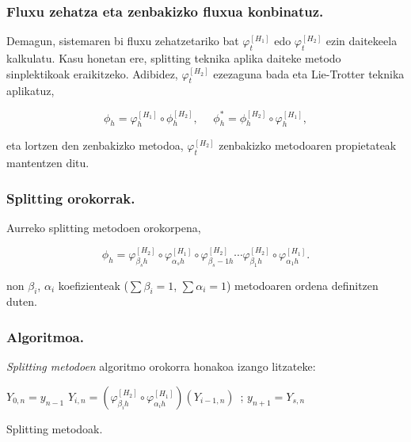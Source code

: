 \subsubsection*{Fluxu zehatza eta zenbakizko fluxua konbinatuz.}
Demagun, sistemaren bi fluxu zehatzetariko bat $\varphi_t^{[H_1]}$ edo $\varphi_t^{[H_2]}$ ezin daitekeela kalkulatu. Kasu honetan ere, splitting teknika aplika daiteke metodo sinplektikoak eraikitzeko. Adibidez, $\varphi_t^{[H_2]}$ ezezaguna bada eta Lie-Trotter teknika aplikatuz,

\begin{equation*}
\phi_h=\varphi_h^{[H_1]} \circ \phi_h^{[H_2]}, \ \ \ \ \ \  \phi_h^{*}=\phi_h^{[H_2]} \circ \varphi_h^{[H_1]},
\end{equation*}

eta lortzen den zenbakizko metodoa, $\varphi_t^{[H_2]}$ zenbakizko metodoaren propietateak mantentzen ditu. 

\subsubsection*{Splitting orokorrak.}

Aurreko splitting metodoen orokorpena,

\begin{equation}
\phi_h = \varphi_{\beta_s h}^{[H_2]} \circ \varphi_{\alpha_s h}^{[H_1]} \circ \varphi_{\beta_s-1 h}^{[H_2]} 
\cdots \varphi_{\beta_1 h}^{[H_2]} \circ \varphi_{\alpha_1 h}^{[H_1]} .
\end{equation}

non $\beta_i$, $\alpha_i$ koefizienteak ($\sum \beta_i=1$, $\sum \alpha_i=1$) metodoaren ordena definitzen duten.


\subsubsection*{Algoritmoa.}

\emph{Splitting metodoen} algoritmo orokorra honakoa izango litzateke:

\begin{algorithm}[H]
 \BlankLine
  {
   \BlankLine
    $Y_{0,n}=y_{n-1} $\;
    \BlankLine
   {
    \BlankLine 
    $Y_{i,n}=(\varphi^{[H_2]}_{\beta_i h} \circ \varphi^{[H_1]}_{\alpha_i h})(Y_{i-1,n})$\ ;
   }
   \BlankLine
    $y_{n+1}=Y_{s,n}$\;
   \BlankLine
 }
 \caption{Splitting metodoak.}
\end{algorithm}

